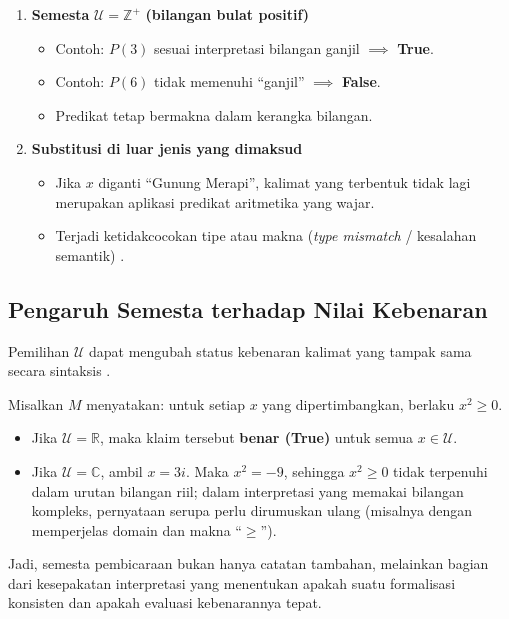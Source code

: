 \begin{enumerate}
    \item \textbf{Semesta } $\mathcal{U} = \mathbb{Z}^+$ \textbf{(bilangan bulat positif)}
    \begin{itemize}
        \item Contoh: $P(3)$ sesuai interpretasi bilangan ganjil $\implies$ \textbf{True}.
        \item Contoh: $P(6)$ tidak memenuhi ``ganjil'' $\implies$ \textbf{False}.
        \item Predikat tetap bermakna dalam kerangka bilangan.
    \end{itemize}

    \item \textbf{Substitusi di luar jenis yang dimaksud}
    \begin{itemize}
        \item Jika $x$ diganti ``Gunung Merapi'', kalimat yang terbentuk tidak lagi merupakan aplikasi predikat aritmetika yang wajar.
        \item Terjadi ketidakcocokan tipe atau makna (\textit{type mismatch} / kesalahan semantik) \cite{wiki_domain_of_discourse}.
    \end{itemize}
\end{enumerate}

\subsection{Pengaruh Semesta terhadap Nilai Kebenaran}

Pemilihan $\mathcal{U}$ dapat mengubah status kebenaran kalimat yang tampak sama secara sintaksis \cite{wiki_first_order_logic}.

\begin{contoh}
Misalkan $M$ menyatakan: untuk setiap $x$ yang dipertimbangkan, berlaku $x^2 \ge 0$.
\begin{itemize}
    \item Jika $\mathcal{U} = \mathbb{R}$, maka klaim tersebut \textbf{benar (True)} untuk semua $x \in \mathcal{U}$.
    \item Jika $\mathcal{U} = \mathbb{C}$, ambil $x = 3i$. Maka $x^2 = -9$, sehingga $x^2 \ge 0$ tidak terpenuhi dalam urutan bilangan riil; dalam interpretasi yang memakai bilangan kompleks, pernyataan serupa perlu dirumuskan ulang (misalnya dengan memperjelas domain dan makna ``$\ge$'').
\end{itemize}
\end{contoh}

Jadi, semesta pembicaraan bukan hanya catatan tambahan, melainkan bagian dari kesepakatan interpretasi yang menentukan apakah suatu formalisasi konsisten dan apakah evaluasi kebenarannya tepat.
